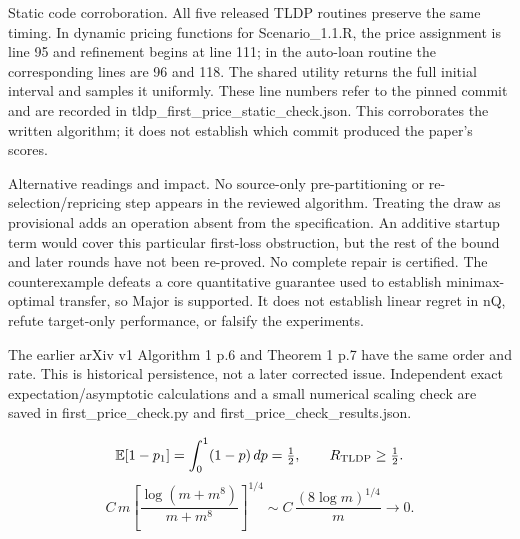 \documentclass[10pt]{article}
\begin{document}
Static code corroboration. All five released TLDP routines preserve the same timing. In dynamic pricing functions for Scenario\_1.1.R, the price assignment is line 95 and refinement begins at line 111; in the auto-loan routine the corresponding lines are 96 and 118. The shared utility returns the full initial interval and samples it uniformly. These line numbers refer to the pinned commit and are recorded in tldp\_first\_price\_static\_check.json. This corroborates the written algorithm; it does not establish which commit produced the paper’s scores.\par
Alternative readings and impact. No source-only pre-partitioning or re-selection/repricing step appears in the reviewed algorithm. Treating the draw as provisional adds an operation absent from the specification. An additive startup term would cover this particular first-loss obstruction, but the rest of the bound and later rounds have not been re-proved. No complete repair is certified. The counterexample defeats a core quantitative guarantee used to establish minimax-optimal transfer, so Major is supported. It does not establish linear regret in nQ, refute target-only performance, or falsify the experiments.\par
The earlier arXiv v1 Algorithm 1 p.6 and Theorem 1 p.7 have the same order and rate. This is historical persistence, not a later corrected issue. Independent exact expectation/asymptotic calculations and a small numerical scaling check are saved in first\_price\_check.py and first\_price\_check\_results.json.\par
\[\mathbb E[1-p_1]=\int_0^1(1-p)\,dp=\tfrac12,\qquad R_{\rm TLDP}\ge\tfrac12.\] \[C\,m\left[\frac{\log(m+m^8)}{m+m^8}\right]^{1/\allowbreak{}4}\sim C\,\frac{(8\log m)^{1/\allowbreak{}4}}{m}\longrightarrow0.\]\par
\end{document}
